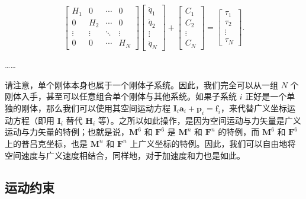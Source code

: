 \documentclass[10pt,a4paper]{book}
\theoremstyle{thmstyle} %
\theoremstyle{defstyle} %
\theoremstyle{prostyle} %
\begin{document}
$$
\left[ \begin{array}{llll} { H _ { 1 } } & { 0 } & { \cdots } & { 0 } \\{ 0 } & { H _ { 2 } } & { \cdots } & { 0 } \\{ \vdots } & { \vdots } & { \ddots } & { \vdots } \\{ 0 } & { 0 } & { \cdots } & { H _ { N } } \end{array} \right] \left[ \begin{array}{l} { \ddot { q } _ { 1 } } \\{ \ddot { q } _ { 2 } } \\{ \vdots } \\{ \ddot { q } _ { N } } \end{array} \right] + \left[ \begin{array}{l} { C _ { 1 } } \\{ C _ { 2 } } \\{ \vdots } \\{ C _ { N } } \end{array} \right] = \left[ \begin{array}{l} { \tau _ { 1 } } \\{ \tau _ { 2 } } \\{ \vdots } \\{ \tau _ { N } } \end{array} \right] .
$$

……



请注意，单个刚体本身也属于一个刚体子系统。因此，我们完全可以从一组 $N$ 个刚体入手，甚至可以任意组合单个刚体与其他系统。如果子系统 $i$ 正好是一个单独的刚体，那么我们可以使用其空间运动方程 $\boldsymbol{I}_{i}\boldsymbol{a}_{i}+\boldsymbol{p}_{i}=\boldsymbol{f}_{i}$，来代替广义坐标运动方程（即用 $\boldsymbol{I}_{i}$ 替代 $\boldsymbol{H}_{i}$ 等）。之所以如此操作，是因为空间运动与力矢量是广义运动与力矢量的特例；也就是说，$\mathbf{M}^{6}$ 和 $\mathbf{F}^{6}$ 是 $\mathbf{M}^{n}$ 和 $\mathbf{F}^{n}$ 的特例，而 $\mathbf{M}^{6}$ 和 $\mathbf{F}^{6}$ 上的普吕克坐标，也是 $\mathbf{M}^{n}$ 和 $\mathbf{F}^{n}$ 上广义坐标的特例。因此，我们可以自由地将空间速度与广义速度相结合，同样地，对于加速度和力也是如此。



\subsection{运动约束}
\end{document}
